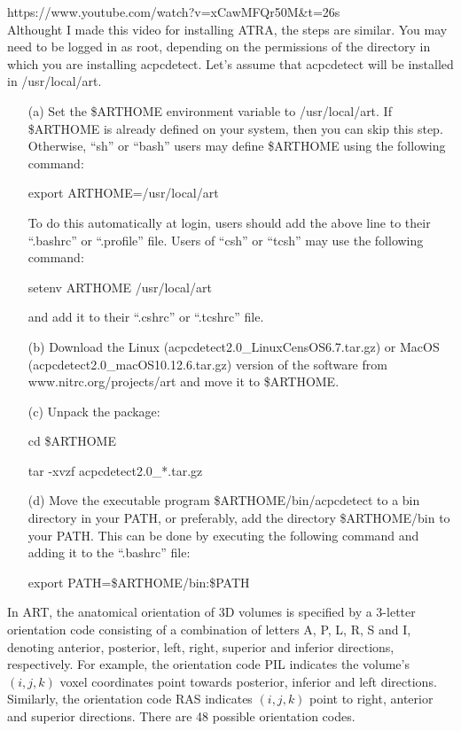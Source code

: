 \documentclass[11pt]{article}
\begin{document}
https://www.youtube.com/watch?v=xCawMFQr50M\&t=26s \\
Althought I made this video for installing ATRA, the steps are similar.
You may need to be logged in as root, depending on the permissions of the directory in which
you are installing acpcdetect. Let's assume that acpcdetect will be installed in
/usr/local/art.
\begin{itemize}
\item[(a)] Set the \$ARTHOME environment variable to /usr/local/art. If \$ARTHOME is already
defined on your system, then you can skip this step. Otherwise, ``sh'' or ``bash'' users may define
\$ARTHOME using the following command: 

export ARTHOME=/usr/local/art 

To do this automatically at login, users should add the above line to their ``.bashrc'' or ``.profile''
file. Users of ``csh'' or ``tcsh'' may use the following command:

setenv ARTHOME /usr/local/art 

and add it to their ``.cshrc'' or ``.tcshrc'' file.

\item[(b)] Download the Linux (acpcdetect2.0\_LinuxCensOS6.7.tar.gz) or MacOS \\
(acpcdetect2.0\_macOS10.12.6.tar.gz) version of the software from www.nitrc.org/projects/art and
move it to \$ARTHOME.

\item[(c)] Unpack the package:

cd \$ARTHOME

tar -xvzf acpcdetect2.0\_*.tar.gz

\item[(d)] Move the executable program \$ARTHOME/bin/acpcdetect to a bin directory in your PATH, or
preferably, add the directory \$ARTHOME/bin to your PATH. This can be done by executing the
following command and adding it to the ``.bashrc'' file:

export PATH=\$ARTHOME/bin:\$PATH

\end{itemize}

In ART, the anatomical orientation of 3D volumes is specified by a 3-letter orientation 
code consisting of a combination of letters A, P, L, R, S and I, denoting anterior, 
posterior, left, right, superior and inferior directions, respectively.  For example, 
the orientation code PIL indicates the volume's $(i, j, k)$ voxel coordinates point 
towards posterior, inferior and left directions. Similarly, the orientation 
code RAS indicates $(i, j, k)$ point to right, anterior and superior directions. 
There are 48 possible orientation codes. \\
\end{document}
